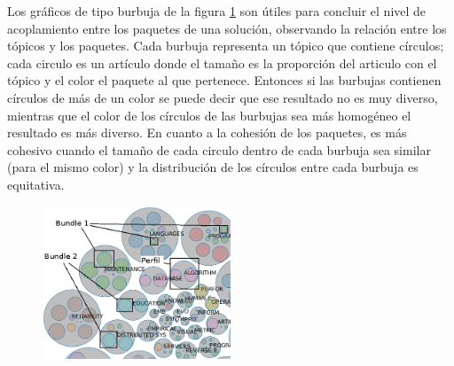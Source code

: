 Los gráficos de tipo burbuja de la figura \ref{res:img-explain-bubbles} son útiles para concluir el nivel de acoplamiento entre los paquetes de una solución, observando la relación entre los tópicos y los paquetes. Cada burbuja representa un tópico que contiene círculos; cada circulo es un artículo donde el tamaño es la proporción del articulo con el tópico y el color el paquete al que pertenece. Entonces si las burbujas contienen círculos de más de un color se puede decir que ese resultado no es muy diverso, mientras que el color de los círculos de las burbujas sea más homogéneo el resultado es más diverso. En cuanto a la cohesión de los paquetes, es más cohesivo cuando el tamaño de cada circulo dentro de cada burbuja sea similar (para el mismo color) y la distribución de los círculos entre cada burbuja es equitativa.

\begin{figure}[H]
  \centering
    \includegraphics[width=0.5\textwidth]{img/explain-bubbles.png}
  \caption{}
  \label{res:img-explain-bubbles}
\end{figure}

